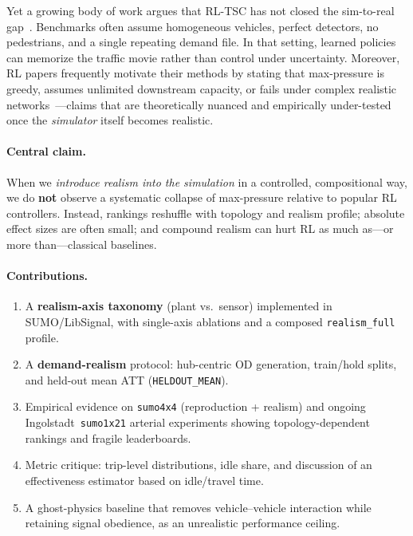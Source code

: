 \documentclass[11pt,a4paper]{article}
\begin{document}
Yet a growing body of work argues that RL-TSC has not closed the sim-to-real gap~\citep{chen2022realdeal,wei2019survey,yau2017survey}.
Benchmarks often assume homogeneous vehicles, perfect detectors, no pedestrians, and a single repeating demand file.
In that setting, learned policies can memorize the traffic movie rather than control under uncertainty.
Moreover, RL papers frequently motivate their methods by stating that max-pressure is greedy, assumes unlimited downstream capacity, or fails under complex realistic networks~\citep{wei2019presslight,wei2019colight}---claims that are theoretically nuanced and empirically under-tested once the \emph{simulator} itself becomes realistic.

\paragraph{Central claim.}
When we \emph{introduce realism into the simulation} in a controlled, compositional way, we do \textbf{not} observe a systematic collapse of max-pressure relative to popular RL controllers.
Instead, rankings reshuffle with topology and realism profile; absolute effect sizes are often small; and compound realism can hurt RL as much as---or more than---classical baselines.

\paragraph{Contributions.}
\begin{enumerate}
  \item A \textbf{realism-axis taxonomy} (plant vs.\ sensor) implemented in SUMO/LibSignal, with single-axis ablations and a composed \texttt{realism\_full} profile.
  \item A \textbf{demand-realism} protocol: hub-centric OD generation, train/hold splits, and held-out mean ATT (\texttt{HELDOUT\_MEAN}).
  \item Empirical evidence on \texttt{sumo4x4} (reproduction + realism) and ongoing Ingolstadt~\texttt{sumo1x21} arterial experiments showing topology-dependent rankings and fragile leaderboards.
  \item Metric critique: trip-level distributions, idle share, and discussion of an effectiveness estimator based on idle/travel time.
  \item A ghost-physics baseline that removes vehicle--vehicle interaction while retaining signal obedience, as an unrealistic performance ceiling.
\end{enumerate}
\end{document}

